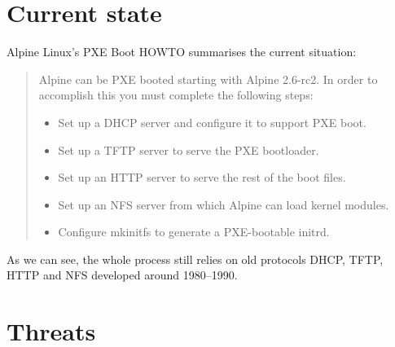 \section{Current state}

Alpine Linux's PXE Boot HOWTO\cite{alpine-pxe-boot-howto} summarises
the current situation:

\begin{quote}
Alpine can be PXE booted starting with Alpine 2.6-rc2. In order to
accomplish this you must complete the following steps:

\begin{itemize}
\item Set up a DHCP server and configure it to support PXE boot.
\item Set up a TFTP server to serve the PXE bootloader.
\item Set up an HTTP server to serve the rest of the boot files.
\item Set up an NFS server from which Alpine can load kernel modules.
\item Configure mkinitfs to generate a PXE-bootable initrd.
\end{itemize}
\end{quote}

As we can see, the whole process still relies on old protocols DHCP,
TFTP, HTTP and NFS developed around 1980--1990.

\section{Threats}
